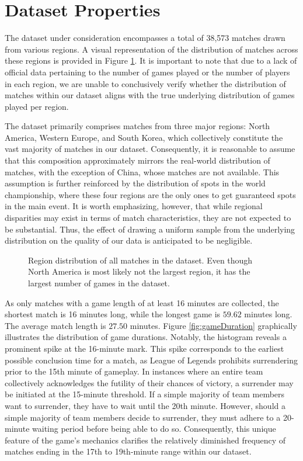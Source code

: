 \documentclass[12pt, a4paper, headinclude, twoside, plainheadsepline, open=right, numbers=noenddot, hidelinks, toc=listof, toc=bibliography]{scrreprt}
\begin{document}
\section{Dataset Properties}
\label{sec:dataprop}

The dataset under consideration encompasses a total of 38,573 matches drawn from various regions. 
A visual representation of the distribution of matches across these regions is provided in Figure \ref{fig:platformId}.
It is important to note that due to a lack of official data pertaining to the number of games played or the number of players in each region, we are unable to conclusively verify whether the distribution of matches within our dataset aligns with the true underlying distribution of games played per region.

The dataset primarily comprises matches from three major regions: North America, Western Europe, and South Korea, which collectively constitute the vast majority of matches in our dataset. 
Consequently, it is reasonable to assume that this composition approximately mirrors the real-world distribution of matches, with the exception of China, whose matches are not available.
This assumption is further reinforced by the distribution of spots in the world championship, where these four regions are the only ones to get guaranteed spots in the main event.
It is worth emphasizing, however, that while regional disparities may exist in terms of match characteristics, they are not expected to be substantial. Thus, the effect of drawing a uniform sample from the underlying distribution on the quality of our data is anticipated to be negligible.

\begin{figure}[ht]

\caption{Region distribution of all matches in the dataset. Even though North America is most likely not the largest region, it has the largest number of games in the dataset.}
\label{fig:platformId}
\end{figure}

As only matches with a game length of at least 16 minutes are collected, the shortest match is 16 minutes long, while the longest game is $59.62$ minutes long.
The average match length is $27.50$ minutes.
Figure \ref{fig:gameDuration} graphically illustrates the distribution of game durations. 
Notably, the histogram reveals a prominent spike at the 16-minute mark.
This spike corresponds to the earliest possible conclusion time for a match, as League of Legends prohibits surrendering prior to the 15th minute of gameplay. In instances where an entire team collectively acknowledges the futility of their chances of victory, a surrender may be initiated at the 15-minute threshold.
If a simple majority of team members want to surrender, they have to wait until the 20th minute.
However, should a simple majority of team members decide to surrender, they must adhere to a 20-minute waiting period before being able to do so. 
Consequently, this unique feature of the game's mechanics clarifies the relatively diminished frequency of matches ending in the 17th to 19th-minute range within our dataset.
\end{document}
